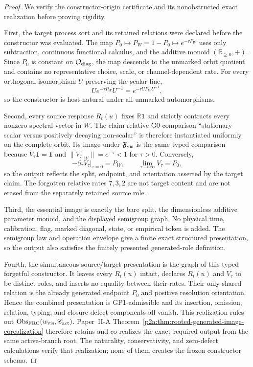 \documentclass[12pt,a4paper]{article}
\begin{document}
\begin{proof}
We verify the constructor-origin certificate and its nonobstructed exact
realization before proving rigidity.

First, the target process sort and its retained relations were declared before
the constructor was evaluated.  The map
\(P_0\mapsto P_W=1-P_0\mapsto e^{-\tau P_W}\) uses only subtraction,
continuous functional calculus, and the additive monoid
\((\mathbb R_{\ge0},+)\).  Since \(P_0\) is constant on
\(\mathcal O_{\rm diag}\), the map descends to the unmarked orbit quotient
and contains no representative choice, scale, or channel-dependent rate.
For every orthogonal isomorphism \(U\) preserving the scalar line,
\[
 Ue^{-\tau P_W}U^{-1}=e^{-\tau UP_WU^{-1}},
\]
so the constructor is host-natural under all unmarked automorphisms.

Second, every source response \(R_t(u)\) fixes \(\mathbb R\mathbf1\) and
strictly contracts every nonzero spectral vector in \(W\).  The
claim-relative G0 comparison “stationary scalar versus positively decaying
non-scalar” is therefore instantiated uniformly on the complete orbit.
Its image under \(\mathfrak F_{\rm vis}\) is the same typed comparison because
\(V_\tau\mathbf1=\mathbf1\) and
\(\|V_\tau|_W\|=e^{-\tau}<1\) for \(\tau>0\).  Conversely,
\[
 -\partial_\tau V_\tau|_{\tau=0}=P_W,
 \qquad
 \lim_{\tau\to\infty}V_\tau=P_0,
\]
so the output reflects the split, endpoint, and orientation asserted by the
target claim.  The forgotten relative rates \(7,3,2\) are not target content
and are not erased from the separately retained source role.

Third, the essential image is exactly the bare split, the dimensionless
additive parameter monoid, and the displayed semigroup graph.  No physical
time, calibration, flag, marked diagonal, state, or empirical token is added.
The semigroup law and operation envelope give a finite exact structured
presentation, so the output also satisfies the finitely presented
generated-role definition.

Fourth, the simultaneous source/target presentation is the graph of this
typed forgetful constructor.  It leaves every \(R_t(u)\) intact, declares
\(R_t(u)\) and \(V_\tau\) to be distinct roles, and inserts no equality
between their rates.  Their only shared relation is the already generated
endpoint \(P_0\) and positive resolution orientation.  Hence the combined
presentation is GP1-admissible and its insertion, omission, relation, typing,
and closure defect components all vanish.  This realization rules out
\(\operatorname{Obs}_{\rm FRC}(w_{\rm vis},\mathscr C_{\rm act})\).
Paper~II-A
Theorem~\ref{p2a:thm:rooted-generated-image-corealization} therefore retains
and co-realizes the exact required output from the same active-branch root.
The naturality, conservativity, and zero-defect calculations verify that
realization; none of them creates the frozen constructor schema.


\end{proof}
\end{document}
